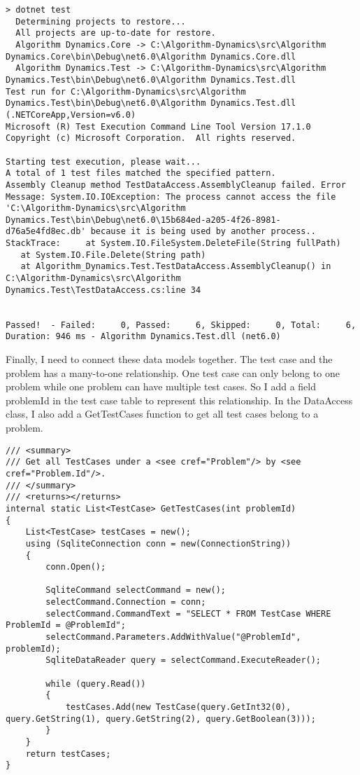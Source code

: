 \documentclass[report.tex]{subfiles}
\begin{document}
\begin{verbatim}
> dotnet test
  Determining projects to restore...
  All projects are up-to-date for restore.
  Algorithm Dynamics.Core -> C:\Algorithm-Dynamics\src\Algorithm Dynamics.Core\bin\Debug\net6.0\Algorithm Dynamics.Core.dll
  Algorithm Dynamics.Test -> C:\Algorithm-Dynamics\src\Algorithm Dynamics.Test\bin\Debug\net6.0\Algorithm Dynamics.Test.dll
Test run for C:\Algorithm-Dynamics\src\Algorithm Dynamics.Test\bin\Debug\net6.0\Algorithm Dynamics.Test.dll (.NETCoreApp,Version=v6.0)
Microsoft (R) Test Execution Command Line Tool Version 17.1.0
Copyright (c) Microsoft Corporation.  All rights reserved.

Starting test execution, please wait...
A total of 1 test files matched the specified pattern.
Assembly Cleanup method TestDataAccess.AssemblyCleanup failed. Error Message: System.IO.IOException: The process cannot access the file 'C:\Algorithm-Dynamics\src\Algorithm Dynamics.Test\bin\Debug\net6.0\15b684ed-a205-4f26-8981-d76a5e4fd8ec.db' because it is being used by another process.. StackTrace:     at System.IO.FileSystem.DeleteFile(String fullPath)
   at System.IO.File.Delete(String path)
   at Algorithm_Dynamics.Test.TestDataAccess.AssemblyCleanup() in C:\Algorithm-Dynamics\src\Algorithm Dynamics.Test\TestDataAccess.cs:line 34


Passed!  - Failed:     0, Passed:     6, Skipped:     0, Total:     6, Duration: 946 ms - Algorithm Dynamics.Test.dll (net6.0)
\end{verbatim}

Finally, I need to connect these data models together. The test case and the problem has a many-to-one relationship. One test case can only belong to one problem while one problem can have multiple test cases. So I add a field problemId in the test case table to represent this relationship. In the DataAccess class, I also add a GetTestCases function to get all test cases belong to a problem.

\begin{verbatim}
/// <summary>
/// Get all TestCases under a <see cref="Problem"/> by <see cref="Problem.Id"/>.
/// </summary>
/// <returns></returns>
internal static List<TestCase> GetTestCases(int problemId)
{
    List<TestCase> testCases = new();
    using (SqliteConnection conn = new(ConnectionString))
    {
        conn.Open();

        SqliteCommand selectCommand = new();
        selectCommand.Connection = conn;
        selectCommand.CommandText = "SELECT * FROM TestCase WHERE ProblemId = @ProblemId";
        selectCommand.Parameters.AddWithValue("@ProblemId", problemId);
        SqliteDataReader query = selectCommand.ExecuteReader();

        while (query.Read())
        {
            testCases.Add(new TestCase(query.GetInt32(0), query.GetString(1), query.GetString(2), query.GetBoolean(3)));
        }
    }
    return testCases;
}
\end{verbatim}
\end{document}

